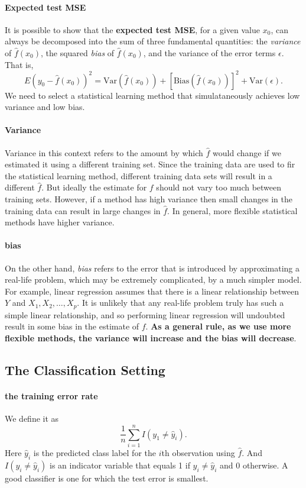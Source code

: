 \documentclass{article}
\begin{document}
\paragraph{Expected test MSE} It is possible to show that the \textbf{expected test MSE}, for a given value $x_0$, can always be decomposed into the sum of three fundamental quantities: the \textit{variance} of $\hat{f}(x_0)$, the squared \textit{bias} of $\hat{f}(x_0)$, and the variance of the error terms $\epsilon$. That is,
\[
	E\left(y_0 - \hat{f}(x_0)\right)^2 = \text{Var}(\hat{f}(x_0)) + \left[\text{Bias}(\hat{f}(x_0))\right]^2 + \text{Var}(\epsilon).
\]
We need to select a statistical learning method that simulataneously achieves low variance and low bias. 

\paragraph{Variance} Variance in this context refers to the amount by which $\hat{f}$ would change if we estimated it using a different training set. Since the training data are used to fir the statistical learning method, different training data sets will result in a different $\hat{f}$. But ideally the estimate for $f$ should not vary too much between training sets. However, if a method has high variance then small changes in the training data can result in large changes in $\hat{f}$. In general, more flexible statistical methods have higher variance. 

\paragraph{bias} On the other hand, \textit{bias} refers to the error that is introduced by approximating a real-life problem, which may be extremely complicated, by a much simpler model. For example, linear regression assumes that there is a linear relationship between $Y$ and $X_1, X_2, \ldots, X_p$. It is unlikely that any real-life problem truly has such a simple linear relationship, and so performing linear regression will undoubted result in some bias in the estimate of $f$. \textbf{As a general rule, as we use more flexible methods, the variance will increase and the bias will decrease}.

\subsection{The Classification Setting}
\paragraph{the training error rate} We define it as 
\[
	\frac{1}{n}\sum_{i=1}^{n}I(y_1 \ne \hat{y}_i).
\]
Here $\hat{y}_i$ is the predicted class label for the $i$th observation using $\hat{f}$. And $I(y_i \ne \hat{y}_i)$ is an indicator variable that equals 1 if $y_i \ne \hat{y}_i$ and 0 otherwise. A good classifier is one for which the test error is smallest.
\end{document}
